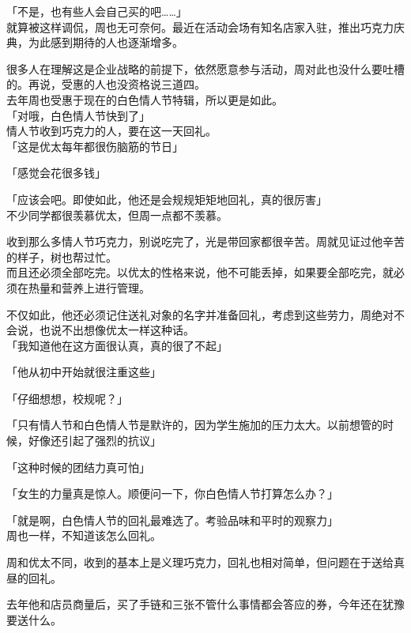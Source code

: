 「不是，也有些人会自己买的吧……」\\

就算被这样调侃，周也无可奈何。最近在活动会场有知名店家入驻，推出巧克力庆典，为此感到期待的人也逐渐增多。

很多人在理解这是企业战略的前提下，依然愿意参与活动，周对此也没什么要吐槽的。再说，受惠的人也没资格说三道四。\\

去年周也受惠于现在的白色情人节特辑，所以更是如此。\\

「对哦，白色情人节快到了」\\

情人节收到巧克力的人，要在这一天回礼。\\

「这是优太每年都很伤脑筋的节日」

「感觉会花很多钱」

「应该会吧。即使如此，他还是会规规矩矩地回礼，真的很厉害」\\

不少同学都很羡慕优太，但周一点都不羡慕。

收到那么多情人节巧克力，别说吃完了，光是带回家都很辛苦。周就见证过他辛苦的样子，树也帮过忙。\\

而且还必须全部吃完。以优太的性格来说，他不可能丢掉，如果要全部吃完，就必须在热量和营养上进行管理。

不仅如此，他还必须记住送礼对象的名字并准备回礼，考虑到这些劳力，周绝对不会说，也说不出想像优太一样这种话。\\

「我知道他在这方面很认真，真的很了不起」

「他从初中开始就很注重这些」

「仔细想想，校规呢？」

「只有情人节和白色情人节是默许的，因为学生施加的压力太大。以前想管的时候，好像还引起了强烈的抗议」

「这种时候的团结力真可怕」

「女生的力量真是惊人。顺便问一下，你白色情人节打算怎么办？」

%
「就是啊，白色情人节的回礼最难选了。考验品味和平时的观察力」\\

周也一样，不知道该怎么回礼。

周和优太不同，收到的基本上是义理巧克力，回礼也相对简单，但问题在于送给真昼的回礼。

去年他和店员商量后，买了手链和三张不管什么事情都会答应的券，今年还在犹豫要送什么。

